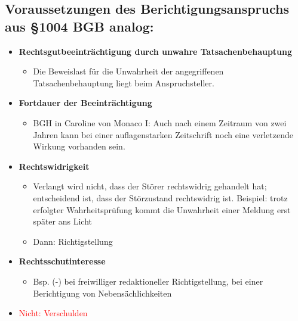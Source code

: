 \subsection{Voraussetzungen des Berichtigungsanspruchs aus §1004 BGB analog:}
\begin{itemize}
    \item \textbf{Rechtsgutbeeinträchtigung durch unwahre Tatsachenbehauptung}
    \begin{itemize}
        \item Die Beweislast für die Unwahrheit der angegriffenen Tatsachenbehauptung liegt beim Anspruchsteller. 
    \end{itemize}
    \item \textbf{Fortdauer der Beeinträchtigung}
    \begin{itemize}
        \item BGH in Caroline von Monaco I: Auch nach einem Zeitraum von zwei Jahren kann bei einer auflagenstarken Zeitschrift noch eine verletzende Wirkung vorhanden sein.
    \end{itemize}
    \item \textbf{Rechtswidrigkeit}
    \begin{itemize}
        \item Verlangt wird nicht, dass der Störer rechtswidrig gehandelt hat; entscheidend ist, dass der Störzustand rechtswidrig ist. Beispiel: trotz erfolgter Wahrheitsprüfung kommt die Unwahrheit einer Meldung erst später ans Licht
        \item Dann: Richtigstellung
    \end{itemize}
    \item \textbf{Rechtsschutinteresse}
    \begin{itemize}
        \item Bsp. (-) bei freiwilliger redaktioneller Richtigstellung, bei einer Berichtigung von Nebensächlichkeiten
    \end{itemize}
    \item \textcolor{red}{Nicht: Verschulden}
\end{itemize}
%
%
%
